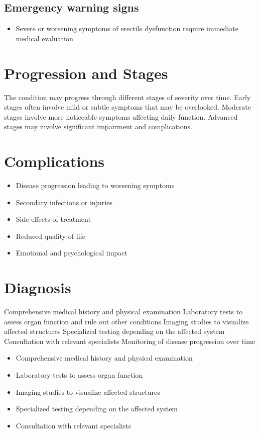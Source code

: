 \subsection{Emergency warning signs}
\begin{itemize}[noitemsep]
  \item Severe or worsening symptoms of erectile dysfunction require immediate medical evaluation
\end{itemize}
\section{Progression and Stages}
The condition may progress through different stages of severity over time. Early stages often involve mild or subtle symptoms that may be overlooked. Moderate stages involve more noticeable symptoms affecting daily function. Advanced stages may involve significant impairment and complications.
\section{Complications}
\begin{itemize}[noitemsep]
  \item Disease progression leading to worsening symptoms
  \item Secondary infections or injuries
  \item Side effects of treatment
  \item Reduced quality of life
  \item Emotional and psychological impact
\end{itemize}
\section{Diagnosis}
Comprehensive medical history and physical examination Laboratory tests to assess organ function and rule out other conditions Imaging studies to visualize affected structures Specialized testing depending on the affected system Consultation with relevant specialists Monitoring of disease progression over time

\begin{itemize}[noitemsep]
  \item Comprehensive medical history and physical examination
  \item Laboratory tests to assess organ function
  \item Imaging studies to visualize affected structures
  \item Specialized testing depending on the affected system
  \item Consultation with relevant specialists
\end{itemize}
